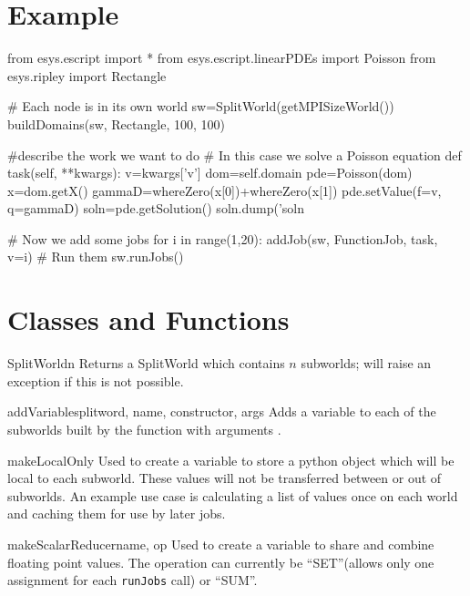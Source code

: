 \section{Example}
\begin{python}
from esys.escript import *
from esys.escript.linearPDEs import Poisson
from esys.ripley import Rectangle 

# Each node is in its own world
sw=SplitWorld(getMPISizeWorld())
buildDomains(sw, Rectangle, 100, 100)

#describe the work we want to do
# In this case we solve a Poisson equation
def task(self, **kwargs):
    v=kwargs['v']
    dom=self.domain
    pde=Poisson(dom)
    x=dom.getX()
    gammaD=whereZero(x[0])+whereZero(x[1])
    pde.setValue(f=v, q=gammaD)
    soln=pde.getSolution()
    soln.dump('soln%

# Now we add some jobs
for i in range(1,20):
    addJob(sw, FunctionJob, task, v=i)
# Run them
sw.runJobs() 
\end{python}

\section{Classes and Functions}

\begin{methoddesc}[SplitWorld]{SplitWorld}{n}
Returns a SplitWorld which contains $n$ subworlds; will raise an exception if this is not possible.
\end{methoddesc}

\begin{funcdesc}{addVariable}{splitword, name, constructor, args}
Adds a variable to each of the subworlds built by the function  with arguments . 
\end{funcdesc}

\begin{funcdesc}{makeLocalOnly}{}
Used to create a variable to store a python object which will be local to each subworld.
These values will not be transferred between or out of subworlds.
An example use case is calculating a list of values once on each world and caching them for use by later jobs.
\end{funcdesc}

\begin{funcdesc}{makeScalarReducer}{name, op}
Used to create a variable to share and combine floating point values.
The operation can currently be ``SET''(allows only one assignment for each \texttt{runJobs} call) or ``SUM''.
\end{funcdesc}

